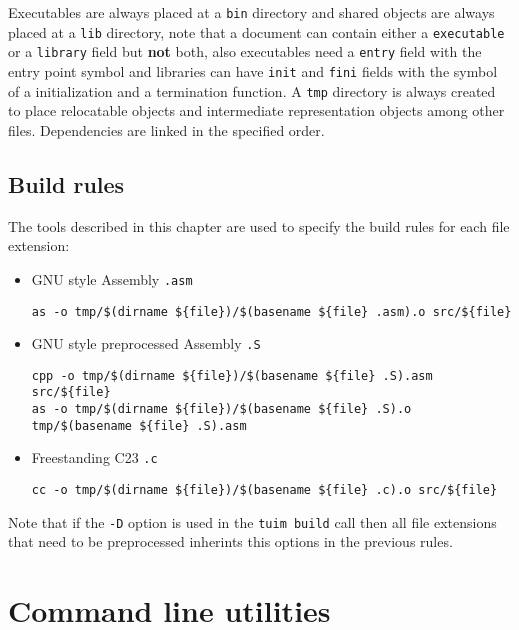 Executables are always placed at a \texttt{bin} directory and
shared objects are always placed at a \texttt{lib} directory,
note that a document can contain either a \texttt{executable} or
a \texttt{library} field but \textbf{not} both,
also executables need a \texttt{entry} field with the entry point symbol
and libraries can have \texttt{init} and \texttt{fini} fields with the symbol
of a initialization and a termination function.
A \texttt{tmp} directory is always created to place relocatable objects
and intermediate representation objects among other files.
Dependencies are linked in the specified order.

\subsection{Build rules}

The tools described in this chapter are used to specify the
build rules for each file extension:

\begin{itemize}

\item GNU style Assembly \texttt{.asm}
\begin{lstlisting}[basicstyle=\tiny,style=bash]
as -o tmp/$(dirname ${file})/$(basename ${file} .asm).o src/${file}
\end{lstlisting}

\item GNU style preprocessed Assembly \texttt{.S}
\begin{lstlisting}[basicstyle=\tiny,style=bash]
cpp -o tmp/$(dirname ${file})/$(basename ${file} .S).asm src/${file}
as -o tmp/$(dirname ${file})/$(basename ${file} .S).o tmp/$(basename ${file} .S).asm
\end{lstlisting}

\item Freestanding C23 \texttt{.c}
\begin{lstlisting}[basicstyle=\tiny,style=bash]
cc -o tmp/$(dirname ${file})/$(basename ${file} .c).o src/${file}
\end{lstlisting}

\end{itemize}

Note that if the \texttt{-D} option is used in the \texttt{tuim build} call
then all file extensions that need to be
preprocessed inherints this options in the previous rules.

\section{Command line utilities}


